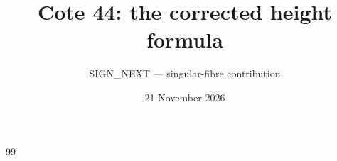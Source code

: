 \documentclass[11pt]{article}
\title{Cote 44: the corrected height formula}
\author{SIGN\_NEXT --- singular-fibre contribution}
\date{21 November 2026}
\begin{document}
\maketitle

\begin{thebibliography}{99}

\end{thebibliography}
\end{document}
